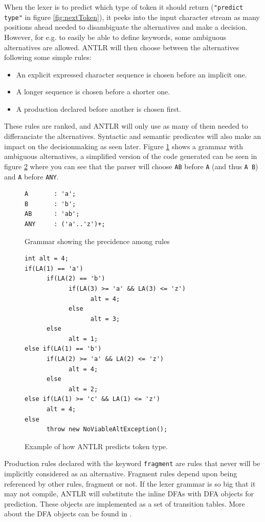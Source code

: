When the lexer is to predict which type of token it should return (\verb!"predict type"! in figure \ref{fig:nextToken}), it peeks into the input character stream as many positions ahead needed to disambiguate the alternatives and make a decision. However, for e.g. to easily be able to define keywords, some ambiguous alternatives are allowed. ANTLR will then choose between the alternatives following some simple rules:
\begin{itemize}
\item An explicit expressed character sequence is chosen before an implicit one.
\item A longer sequence is chosen before a shorter one.
\item A production declared before another is chosen first.
\end{itemize}
These rules are ranked, and ANTLR will only use as many of them needed to differanciate the alternatives. Syntactic and semantic predicates will also make an impact on the decisionmaking as seen later. Figure \ref{fig:grammarPrec} shows a grammar with ambiguous alternatives, a simplified version of the code generated can be seen in figure \ref{fig:codeGenerated} where you can see that the parser will choose \verb!AB! before \verb!A! (and thus \verb!A B!) and \verb!A! before \verb!ANY!.
\begin{figure}[h!]
\begin{verbatim}
A       : 'a';
B       : 'b';
AB      : 'ab';
ANY     : ('a'..'z')+;
\end{verbatim}
\caption{Grammar showing the precidence among rules}
\label{fig:grammarPrec}
\end{figure}

\begin{figure}[h!]
\begin{verbatim}
int alt = 4;
if(LA(1) == 'a')
      if(LA(2) == 'b')
            if(LA(3) >= 'a' && LA(3) <= 'z')
                  alt = 4;
            else
                  alt = 3;
      else
            alt = 1;
else if(LA(1) == 'b')
      if(LA(2) >= 'a' && LA(2) <= 'z')
            alt = 4;
      else
            alt = 2;
else if(LA(1) >= 'c' && LA(1) <= 'z')
      alt = 4;
else
      throw new NoViableAltException();
\end{verbatim}
\caption{Example of how ANTLR predicts token type.}
\label{fig:codeGenerated}
\end{figure}
Production rules declared with the keyword \verb!fragment! are rules that never will be implicitly considered as an alternative. Fragment rules depend upon being referenced by other rules, fragment or not.
If the lexer grammar is so big that it may not compile, ANTLR will substitute the inline DFAs with DFA objects for prediction. These objects are implemented as a set of transition tables. More about the DFA objects can be found in \cite{antlrCodeGen}.

